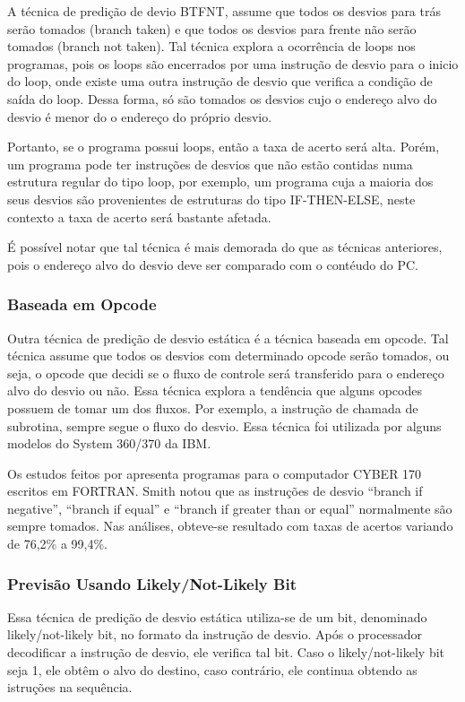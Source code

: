 \documentclass[12pt]{article}
\begin{document}
A técnica de predição de devio BTFNT, assume que todos os desvios para trás serão tomados (branch taken) e que todos os desvios para frente não serão tomados (branch not taken). Tal técnica explora a ocorrência de loops nos programas, pois os loops são encerrados por uma instrução de desvio para o inicio do loop, onde existe uma outra instrução de desvio que verifica a condição de saída do loop. Dessa forma, só são tomados os desvios cujo o endereço alvo do desvio é menor do o endereço do próprio desvio. 

Portanto, se o programa possui loops, então a taxa de acerto será alta. Porém, um programa pode ter instruções de desvios que não estão contidas numa estrutura regular do tipo loop, por exemplo, um programa cuja a maioria dos seus desvios são provenientes de estruturas do tipo IF-THEN-ELSE, neste contexto a taxa de acerto será bastante afetada.

É possível notar que tal técnica é mais demorada do que as técnicas anteriores, pois o endereço alvo do desvio deve ser comparado com o contéudo do PC.

\subsubsection{Baseada em Opcode}

Outra técnica de predição de desvio estática é a técnica baseada em opcode. Tal técnica assume que todos os desvios com determinado opcode serão tomados, ou seja, o opcode que decidi se o fluxo de controle será transferido para o endereço alvo do desvio ou não. Essa técnica explora a tendência que alguns opcodes possuem de tomar um dos fluxos. Por exemplo, a instrução de chamada de subrotina, sempre segue o fluxo do desvio. Essa técnica foi utilizada por alguns modelos do System 360/370 da IBM.

Os estudos feitos por \cite{smith1981study} apresenta programas para o computador CYBER 170 escritos em FORTRAN. Smith notou que as instruções de desvio ``branch if negative'', ``branch if equal'' e ``branch if greater than or equal'' normalmente são sempre tomados. Nas análises, obteve-se resultado com taxas de acertos variando de 76,2\% a 99,4\%.

\subsubsection{Previsão Usando Likely/Not-Likely Bit}

Essa técnica de predição de desvio estática utiliza-se de um bit, denominado likely/not-likely bit, no formato da instrução de desvio. Após o processador decodificar a instrução de desvio, ele verifica tal bit. Caso o likely/not-likely bit seja 1, ele obtêm o alvo do destino, caso contrário, ele continua obtendo as istruções na sequência. 
\end{document}
